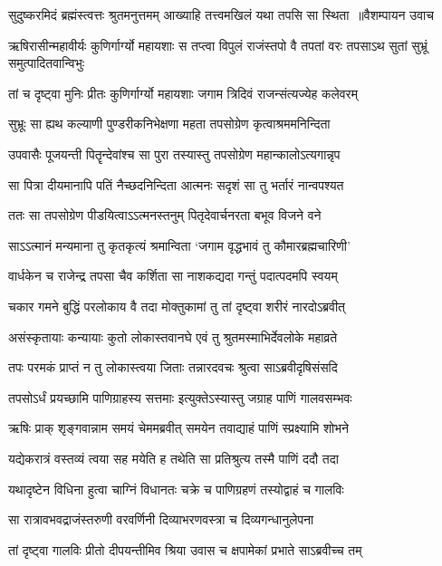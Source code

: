 \threelineshloka
{सुदुष्करमिदं ब्रह्मंस्त्वत्तः श्रुतमनुत्तमम्}
{आख्याहि तत्त्वमखिलं यथा तपसि सा स्थिता ॥वैशम्पायन उवाच}
{}


\threelineshloka
{ऋषिरासीन्महावीर्यः कुणिर्गार्ग्यो महायशाः}
{स तप्त्वा विपुलं राजंस्तपो वै तपतां वरः}
{तपसाऽथ सुतां सुभ्रूं समुत्पादितवान्विभुः}


\twolineshloka
{तां च दृष्ट्वा मुनिः प्रीतः कुणिर्गार्ग्यो महायशाः}
{जगाम त्रिदिवं राजन्संत्यज्येह कलेवरम्}


\twolineshloka
{सुभ्रूः सा ह्यथ कल्याणी पुण्डरीकनिभेक्षणा}
{महता तपसोग्रेण कृत्वाश्रममनिन्दिता}


\twolineshloka
{उपवासैः पूजयन्ती पितॄन्देवांश्च सा पुरा}
{तस्यास्तु तपसोग्रेण महान्कालोऽत्यगान्नृप}


\twolineshloka
{सा पित्रा दीयमानापि पतिं नैच्छदनिन्दिता}
{आत्मनः सदृशं सा तु भर्तारं नान्वपश्यत}


\twolineshloka
{ततः सा तपसोग्रेण पीडयित्वाऽऽत्मनस्तनुम्}
{पितृदेवार्चनरता बभूव विजने वने}


\twolineshloka
{साऽऽत्मानं मन्यमाना तु कृतकृत्यं श्रमान्विता}
{`जगाम वृद्धभावं तु कौमारब्रह्मचारिणी'}


\twolineshloka
{वार्धकेन च राजेन्द्र तपसा चैव कर्शिता}
{सा नाशकद्यदा गन्तुं पदात्पदमपि स्वयम्}


\twolineshloka
{चकार गमने बुद्धिं परलोकाय वै तदा}
{मोक्तुकामां तु तां दृष्ट्वा शरीरं नारदोऽब्रवीत्}


\twolineshloka
{असंस्कृतायाः कन्यायाः कुतो लोकास्तवानघे}
{एवं तु श्रुतमस्माभिर्देवलोके महाव्रते}


\twolineshloka
{तपः परमकं प्राप्तं न तु लोकास्त्वया जिताः}
{तन्नारदवचः श्रुत्वा साऽब्रवीदृषिसंसदि}


\twolineshloka
{तपसोऽर्धं प्रयच्छामि पाणिग्राहस्य सत्तमाः}
{इत्युक्तेऽस्यास्तु जग्राह पाणिं गालवसम्भवः}


\twolineshloka
{ऋषिः प्राक् शृङ्गवान्नाम समयं चेममब्रवीत्}
{समयेन तवाद्याहं पाणिं स्प्रक्ष्यामि शोभने}


\twolineshloka
{यद्येकरात्रं वस्तव्यं त्वया सह मयेति ह}
{तथेति सा प्रतिश्रुत्य तस्मै पाणिं ददौ तदा}


\twolineshloka
{यथादृष्टेन विधिना हुत्वा चाग्निं विधानतः}
{चक्रे च पाणिग्रहणं तस्योद्वाहं च गालविः}


\twolineshloka
{सा रात्रावभवद्राजंस्तरुणी वरवर्णिनी}
{दिव्याभरणवस्त्रा च दिव्यगन्धानुलेपना}


\twolineshloka
{तां दृष्ट्वा गालविः प्रीतो दीपयन्तीमिव श्रिया}
{उवास च क्षपामेकां प्रभाते साऽब्रवीच्च तम्}


